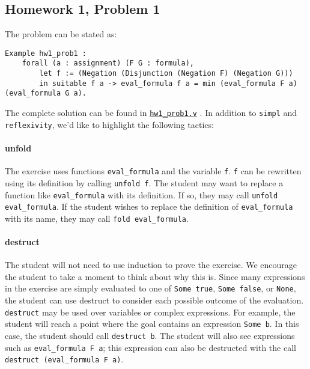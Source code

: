 \documentclass{article}
\newcommand{\link}[3]{%
    \underline{\texttt{\href{#1:#2}{#3}}}%
}
\begin{document}
\subsection{Homework 1, Problem 1}
The problem can be stated as:

\begin{lstlisting}
Example hw1_prob1 : 
    forall (a : assignment) (F G : formula),
        let f := (Negation (Disjunction (Negation F) (Negation G)))
        in suitable f a -> eval_formula f a = min (eval_formula F a) (eval_formula G a).
\end{lstlisting}

The complete solution can be found in \link{run}{hw1_prob1.v}{hw1_prob1.v}. In addition to \verb|simpl| and \verb|reflexivity|, we'd like to highlight the following tactics:

\paragraph{unfold} The exercise uses functions \verb|eval_formula| and the variable \verb|f|. \verb|f| can be rewritten using its definition by calling \verb|unfold f|. The student may want to replace a function like \verb|eval_formula| with its definition. If so, they may call \verb|unfold eval_formula|. If the student wishes to replace the definition of \verb|eval_formula| with its name, they may call \verb|fold eval_formula|.
\paragraph{destruct} The student will not need to use induction to prove the exercise. We encourage the student to take a moment to think about why this is. Since many expressions in the exercise are simply evaluated to one of \verb|Some true|, \verb|Some false|, or \verb|None|, the student can use destruct to consider each possible outcome of the evaluation. \verb|destruct| may be used over variables or complex expressions. For example, the student will reach a point where the goal contains an expression \verb|Some b|. In this case, the student should call \verb|destruct b|. The student will also see expressions such as \verb|eval_formula F a|; this expression can also be destructed with the call \verb|destruct (eval_formula F a)|.
\end{document}
